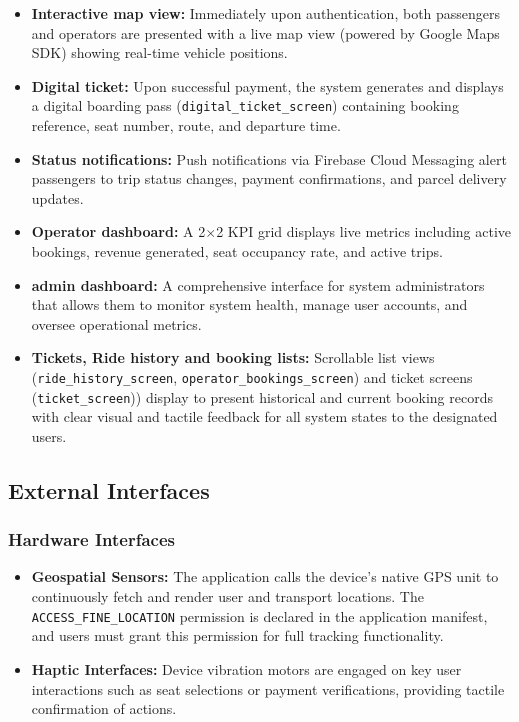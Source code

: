 \begin{itemize}
 \item \textbf{Interactive map view:} Immediately upon authentication,
both passengers and operators are presented with a live map view (powered by
Google Maps SDK) showing real-time vehicle positions.

 \item \textbf{Digital ticket:} Upon successful payment, the system
generates and displays a digital boarding pass
(\texttt{digital\_ticket\_screen}) containing booking reference, seat number,
route, and departure time.

 \item \textbf{Status notifications:} Push notifications via Firebase
Cloud Messaging alert passengers to trip status changes, payment confirmations,
and parcel delivery updates.

 \item \textbf{Operator dashboard:} A 2$\times$2 KPI grid displays live
metrics including active bookings, revenue generated, seat occupancy rate, and
active trips.
 \item \textbf{admin dashboard:} A comprehensive interface for system administrators that
allows them to monitor system health, manage user accounts, and oversee operational metrics.
 \item \textbf{Tickets, Ride history and booking lists:} Scrollable list views
(\texttt{ride\_history\_screen}, \texttt{operator\_bookings\_screen}) and ticket screens (\texttt{ticket\_screen}))
display to present historical and current booking records with clear visual and tactile feedback
for all system states to the designated users.

\end{itemize}

\subsection{External Interfaces}

\subsubsection{Hardware Interfaces}

\begin{itemize}
 \item \textbf{Geospatial Sensors:} The application calls the device's
native GPS unit to continuously fetch and render user and transport locations.
The \texttt{ACCESS\_FINE\_LOCATION} permission is declared in the application
manifest, and users must grant this permission for full tracking functionality.

 \item \textbf{Haptic Interfaces:} Device vibration motors are engaged on
key user interactions such as seat selections or payment verifications,
providing tactile confirmation of actions.

\end{itemize}

